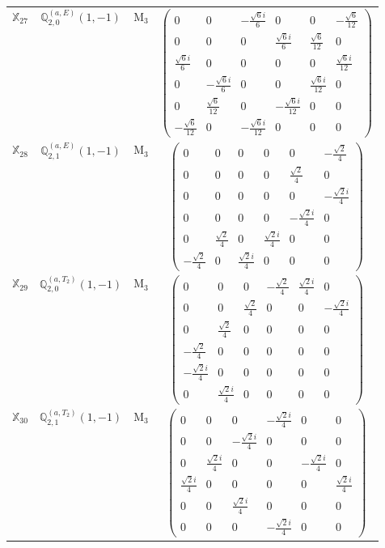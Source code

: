 \documentclass[fleqn,10pt,landscape]{article}
\begin{document}
\begin{itemize}
\begin{center}
\begin{longtable}{c|c|c|c}
$ \mathbb{X}_{27} $ & $\mathbb{Q}_{2,0}^{(a,E)}(1,-1)$ & M$_{3}$ & $\begin{pmatrix} 0 & 0 & - \frac{\sqrt{6} i}{6} & 0 & 0 & - \frac{\sqrt{6}}{12} \\ 0 & 0 & 0 & \frac{\sqrt{6} i}{6} & \frac{\sqrt{6}}{12} & 0 \\ \frac{\sqrt{6} i}{6} & 0 & 0 & 0 & 0 & \frac{\sqrt{6} i}{12} \\ 0 & - \frac{\sqrt{6} i}{6} & 0 & 0 & \frac{\sqrt{6} i}{12} & 0 \\ 0 & \frac{\sqrt{6}}{12} & 0 & - \frac{\sqrt{6} i}{12} & 0 & 0 \\ - \frac{\sqrt{6}}{12} & 0 & - \frac{\sqrt{6} i}{12} & 0 & 0 & 0 \end{pmatrix}$ \\
$ \mathbb{X}_{28} $ & $\mathbb{Q}_{2,1}^{(a,E)}(1,-1)$ & M$_{3}$ & $\begin{pmatrix} 0 & 0 & 0 & 0 & 0 & - \frac{\sqrt{2}}{4} \\ 0 & 0 & 0 & 0 & \frac{\sqrt{2}}{4} & 0 \\ 0 & 0 & 0 & 0 & 0 & - \frac{\sqrt{2} i}{4} \\ 0 & 0 & 0 & 0 & - \frac{\sqrt{2} i}{4} & 0 \\ 0 & \frac{\sqrt{2}}{4} & 0 & \frac{\sqrt{2} i}{4} & 0 & 0 \\ - \frac{\sqrt{2}}{4} & 0 & \frac{\sqrt{2} i}{4} & 0 & 0 & 0 \end{pmatrix}$ \\
$ \mathbb{X}_{29} $ & $\mathbb{Q}_{2,0}^{(a,T_{2})}(1,-1)$ & M$_{3}$ & $\begin{pmatrix} 0 & 0 & 0 & - \frac{\sqrt{2}}{4} & \frac{\sqrt{2} i}{4} & 0 \\ 0 & 0 & \frac{\sqrt{2}}{4} & 0 & 0 & - \frac{\sqrt{2} i}{4} \\ 0 & \frac{\sqrt{2}}{4} & 0 & 0 & 0 & 0 \\ - \frac{\sqrt{2}}{4} & 0 & 0 & 0 & 0 & 0 \\ - \frac{\sqrt{2} i}{4} & 0 & 0 & 0 & 0 & 0 \\ 0 & \frac{\sqrt{2} i}{4} & 0 & 0 & 0 & 0 \end{pmatrix}$ \\
$ \mathbb{X}_{30} $ & $\mathbb{Q}_{2,1}^{(a,T_{2})}(1,-1)$ & M$_{3}$ & $\begin{pmatrix} 0 & 0 & 0 & - \frac{\sqrt{2} i}{4} & 0 & 0 \\ 0 & 0 & - \frac{\sqrt{2} i}{4} & 0 & 0 & 0 \\ 0 & \frac{\sqrt{2} i}{4} & 0 & 0 & - \frac{\sqrt{2} i}{4} & 0 \\ \frac{\sqrt{2} i}{4} & 0 & 0 & 0 & 0 & \frac{\sqrt{2} i}{4} \\ 0 & 0 & \frac{\sqrt{2} i}{4} & 0 & 0 & 0 \\ 0 & 0 & 0 & - \frac{\sqrt{2} i}{4} & 0 & 0 \end{pmatrix}$ \\

\end{longtable}
\end{center}
\end{itemize}
\end{document}
